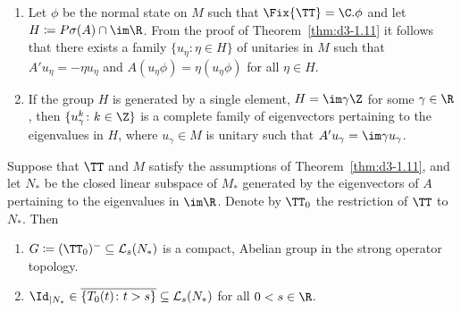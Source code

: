 \begin{remarks}\label{rem:d3-1.12}

\begin{enumerate}[\upshape (i), wide, labelindent=.25em]

\item 
Let $\phi$ be the normal state on $M$ such that 
$\Fix{\TT} = \C.\phi$ and let $H \coloneqq P\sigma(A) \cap \im\R$.
From the proof of Theorem~\ref{thm:d3-1.11} it follows that there exists a family $\{u_{\eta} \colon \eta \in H\}$ of unitaries in $M$ such that $A'u_{\eta} = -\eta u_{\eta}$ and $A(u_{\eta}\phi) = \eta(u_{\eta}\phi)$ for all $\eta \in H$.

\item 
If the group $H$ is generated by a single element, \ie $H = \im\gamma\Z$ for some $\gamma \in \R$, then 
$\{u_{\gamma}^{k} \colon k \in \Z\}$ 
is a complete family of eigenvectors pertaining to the eigenvalues in $H$, where $u_{\gamma} \in M$ is unitary such that $A'u_{\gamma} = \im\gamma u_{\gamma}$.

\end{enumerate}
\end{remarks}
\begin{proposition}\label{prop:d3-1.13}
Suppose that $\TT$ and $M$ satisfy the assumptions of Theorem~\ref{thm:d3-1.11}, and let $N_{*}$ be the closed linear subspace of\/ $M_{*}$ generated by the eigenvectors of\/ $A$ pertaining to the eigenvalues in $\im\R$.
Denote by $\TT_{0}$ the restriction of\/ $\TT$ to $N_{*}$.
Then
\begin{enumerate}[\upshape (i)]

\item 
$G \coloneqq (\TT_{0})^{-} \subseteq \mathcal{L}_{s}(N_{*})$ is a compact, Abelian group in the strong operator topology.

\item 
$\Id_{| N_{{*}}} \in \overline{\{T_{0}(t) \colon t>s\}} \subseteq \mathcal{L}_{s}(N_{*})$ for all $0<s \in \R$.
\end{enumerate}
\end{proposition}
